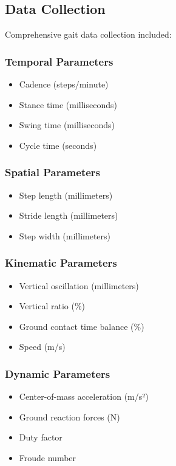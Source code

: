 \documentclass[12pt]{article}
\begin{document}
\subsection{Data Collection}

Comprehensive gait data collection included:

\subsubsection{Temporal Parameters}
\begin{itemize}
\item Cadence (steps/minute)
\item Stance time (milliseconds)
\item Swing time (milliseconds)
\item Cycle time (seconds)
\end{itemize}

\subsubsection{Spatial Parameters}
\begin{itemize}
\item Step length (millimeters)
\item Stride length (millimeters)
\item Step width (millimeters)
\end{itemize}

\subsubsection{Kinematic Parameters}
\begin{itemize}
\item Vertical oscillation (millimeters)
\item Vertical ratio (\%)
\item Ground contact time balance (\%)
\item Speed (m/s)
\end{itemize}

\subsubsection{Dynamic Parameters}
\begin{itemize}
\item Center-of-mass acceleration (m/s²)
\item Ground reaction forces (N)
\item Duty factor
\item Froude number
\end{itemize}
\end{document}
